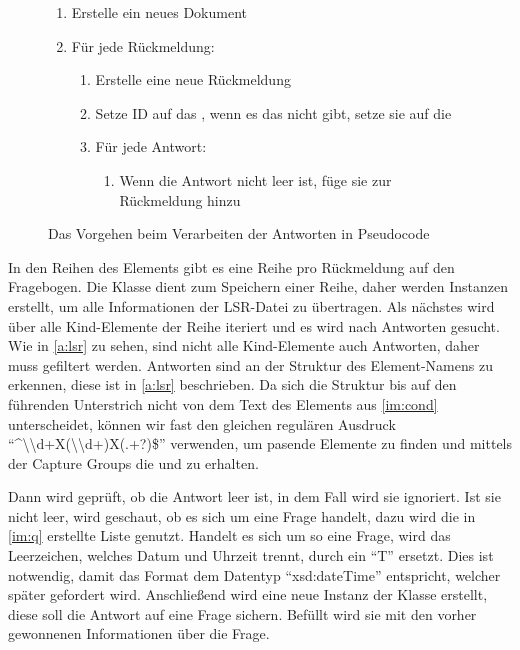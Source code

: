 \begin{figure}[h]
	\begin{enumerate}
		\item Erstelle ein neues Dokument
		\item Für jede Rückmeldung:

			\begin{enumerate}
				\item Erstelle eine neue Rückmeldung
				\item Setze ID auf das , wenn es das nicht gibt, setze sie auf die 
				\item Für jede Antwort:

					\begin{enumerate}
							\item Wenn die Antwort nicht leer ist, füge sie zur Rückmeldung hinzu
					\end{enumerate}
			\end{enumerate}
	\end{enumerate}
	\caption{Das Vorgehen beim Verarbeiten der Antworten in Pseudocode}
	\label{alg:lsr}
\end{figure}

In den Reihen des  Elements gibt es eine Reihe pro Rückmeldung auf den Fragebogen.
Die Klasse  dient zum Speichern einer Reihe, daher werden Instanzen erstellt, um alle Informationen der LSR-Datei zu übertragen.
Als nächstes wird über alle Kind-Elemente der Reihe iteriert und es wird nach Antworten gesucht.
Wie in \cref{a:lsr} zu sehen, sind nicht alle Kind-Elemente auch Antworten, daher muss gefiltert werden.
Antworten sind an der Struktur des Element-Namens zu erkennen, diese ist in \cref{a:lsr} beschrieben.
Da sich die Struktur bis auf den führenden Unterstrich nicht von dem Text des Elements  aus \cref{im:cond} unterscheidet, können wir fast den gleichen regulären Ausdruck \enquote{\textasciicircum\textunderscore\textbackslash\textbackslash d+X(\textbackslash\textbackslash d+)X(.+?)\$} verwenden, um pasende Elemente zu finden und mittels der Capture Groups die  und  zu erhalten.

Dann wird geprüft, ob die Antwort leer ist, in dem Fall wird sie ignoriert.
Ist sie nicht leer, wird geschaut, ob es sich um eine  Frage handelt, dazu wird die in \cref{im:q} erstellte Liste genutzt. Handelt es sich um so eine Frage, wird das Leerzeichen, welches Datum und Uhrzeit trennt, durch ein \enquote{T} ersetzt.
Dies ist notwendig, damit das Format dem Datentyp \enquote{xsd:dateTime} entspricht, welcher später gefordert wird.
Anschließend wird eine neue Instanz der Klasse  erstellt, diese soll die Antwort auf eine Frage sichern.
Befüllt wird sie mit den vorher gewonnenen Informationen über die Frage.

